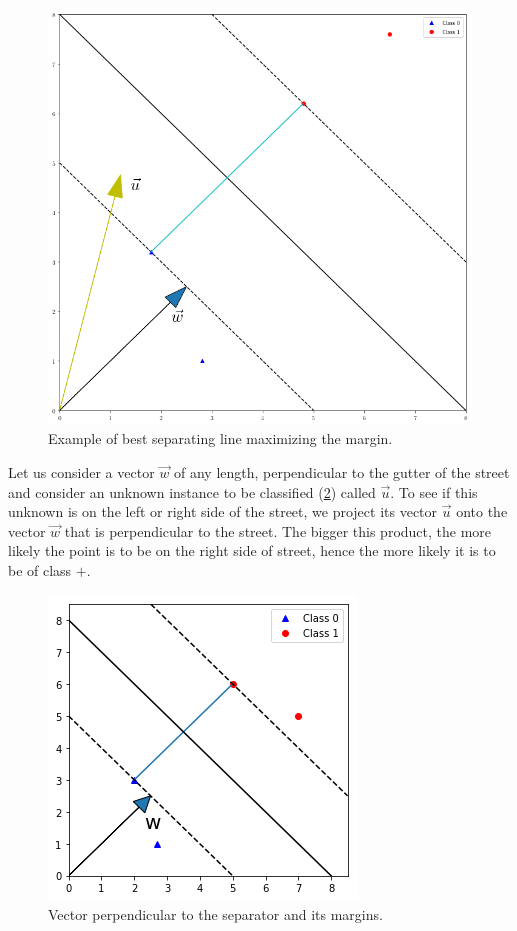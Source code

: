 \documentclass[12pt, letterpaper]{article}
\theoremstyle{definition}
\begin{document}
\begin{figure}
\centering
\includegraphics[scale=0.6]{img/separableClassesPy}
\caption{Example of best separating line maximizing the margin.}
\label{separableClassesPy}
\end{figure}

Let us consider a vector $\vec{w}$ of any length, perpendicular to the gutter of the street and consider an unknown instance to be classified (\ref{W}) called $\vec{u}$. To see if this unknown is on the left or right side of the street, we project its vector $\vec{u}$ onto the vector $\vec{w}$ that is perpendicular to the street. The bigger this product, the more likely the point is to be on the right side of street, hence the more likely it is to be of class $+$.

\begin{figure}
\centering
\includegraphics[scale=0.6]{img/W}
\caption{Vector perpendicular to the separator and its margins.}
\label{W}
\end{figure}
\end{document}
